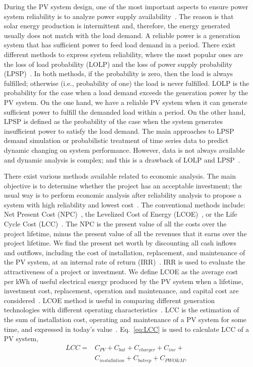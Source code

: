 \documentclass[journal]{IEEEtran}
\begin{document}
During the PV system design, one of the most important aspects to ensure power system reliability is to analyze power supply availability~\cite{Alsadi2018}. The reason is that solar energy production is intermittent and, therefore, the energy generated usually does not match with the load demand. A reliable power is a generation system that has sufficient power to feed load demand in a period. There exist different methods to express system reliability, where the most popular ones are the loss of load probability (LOLP) and the loss of power supply probability (LPSP)~\cite{Alsadi2018}. In both methods, if the probability is zero, then the load is always fulfilled; otherwise (i.e., probability of one) the load is never fulfilled. LOLP is the probability for the case when a load demand exceeds the generation power by the PV system. On the one hand,  we have a reliable PV system when it can generate sufficient power to fulfill the demanded load within a period. On the other hand, LPSP is defined as the probability of the case when the system generates insufficient power to satisfy the load demand. The main approaches to LPSP demand simulation or probabilistic treatment of time series data to predict dynamic changing on system performance. However, data is not always available and dynamic analysis is complex; and this is a drawback of LOLP and LPSP~\cite{Alsadi2018}.

There exist various methods available related to economic analysis. The main objective is to determine whether the project has an acceptable investment; the usual way is to perform economic analysis after reliability analysis to propose a system with high reliability and lowest cost~\cite{Alsadi2018}. The conventional methods include: Net Present Cost (NPC)~\cite{Park2004}, the Levelized Cost of Energy (LCOE)~\cite{Zhou2010}, or the Life Cycle Cost (LCC)~\cite{Applasamy2011}. The NPC is the present value of all the costs over the project lifetime, minus the present value of all the revenues that it earns over the project lifetime. We find the present net worth by discounting all cash inflows and outflows, including the cost of installation, replacement, and maintenance of the PV system, at an internal rate of return (IRR)~\cite{Park2004}. IRR is used to evaluate the attractiveness of a project or investment. We define LCOE as the average cost per kWh of useful electrical energy produced by the PV system when a lifetime, investment cost, replacement, operation and maintenance, and capital cost are considered~\cite{Kamel2005}. LCOE method is useful in comparing different generation technologies with different operating characteristics~\cite{Zhou2010}. LCC is the estimation of the sum of installation cost, operating and maintenance of a PV system for some time, and expressed in today's value~\cite{Applasamy2011}. Eq.~\eqref{eq:LCC} is used to calculate LCC of a PV system,
%
\begin{equation}
\label{eq:LCC}
\begin{aligned}
LCC = & C_{PV} + C_{bat} + C_{charger} + C_{inv} + \\
      & C_{installation} + C_{batrep} + C_{PWO\&M},
\end{aligned}
\end{equation}
\end{document}
